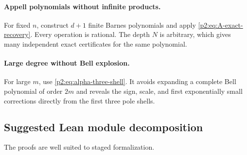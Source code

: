 \documentclass[11pt,oneside]{article}
\numberwithin{equation}{section}
\theoremstyle{definition}
\theoremstyle{remark}
\begin{document}
\paragraph{Appell polynomials without infinite products.}
For fixed $n$, construct $d+1$ finite Barnes polynomials and apply
\eqref{p2:eq:A-exact-recovery}.  Every operation is rational.  The depth $N$ is arbitrary, which gives
many independent exact certificates for the same polynomial.

\paragraph{Large degree without Bell explosion.}
For large $m$, use \eqref{p2:eq:alpha-three-shell}.  It avoids expanding a complete Bell polynomial of
order $2m$ and reveals the sign, scale, and first exponentially small corrections directly from the
first three pole shells.

\subsection{Suggested Lean module decomposition}

The proofs are well suited to staged formalization.
\end{document}
